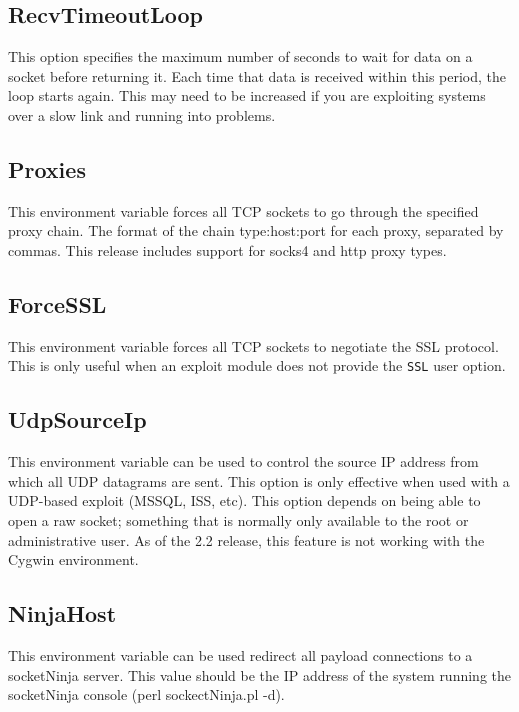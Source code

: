 \documentclass{report}
\begin{document}
	\subsection{RecvTimeoutLoop}
\par
This option specifies the maximum number of seconds to wait for data on a socket
before returning it. Each time that data is received within this period, the
loop starts again. This may need to be increased if you are exploiting systems
over a slow link and running into problems.  

	\subsection{Proxies}
\par
This environment variable forces all TCP sockets to go through the specified
proxy chain. The format of the chain type:host:port for each proxy, separated by
commas. This release includes support for socks4 and http proxy types. 

	\subsection{ForceSSL}
\par
This environment variable forces all TCP sockets to negotiate the SSL protocol.
This is only useful when an exploit module does not provide the \texttt{SSL}
user option.  

	\subsection{UdpSourceIp}
\par
This environment variable can be used to control the source IP address from
which all UDP datagrams are sent. This option is only effective when used with a
UDP-based exploit (MSSQL, ISS, etc). This option depends on being able to open a
raw socket; something that is normally only available to the root or
administrative user. As of the 2.2 release, this feature is not working with the
Cygwin environment. 

	\subsection{NinjaHost}
\par
This environment variable can be used redirect all payload connections to a
socketNinja server. This value should be the IP address of the system running
the socketNinja console (perl sockectNinja.pl -d).  
\end{document}
